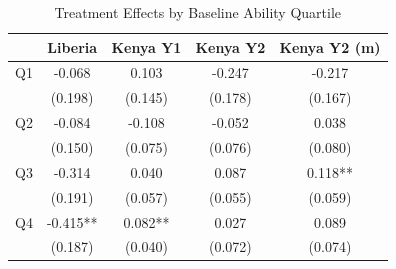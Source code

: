 \begin{table}[htbp]
\centering
\small
\caption{Treatment Effects by Baseline Ability Quartile}
\label{tab:quartiles}
\begin{tabular}{l*{4}{c}}
\toprule
 & Liberia & Kenya Y1 & Kenya Y2 & Kenya Y2 (m) \\
\midrule
Q1 & -0.068 & 0.103 & -0.247 & -0.217 \\
 & (0.198) & (0.145) & (0.178) & (0.167) \\
\addlinespace
Q2 & -0.084 & -0.108 & -0.052 & 0.038 \\
 & (0.150) & (0.075) & (0.076) & (0.080) \\
\addlinespace
Q3 & -0.314 & 0.040 & 0.087 & 0.118** \\
 & (0.191) & (0.057) & (0.055) & (0.059) \\
\addlinespace
Q4 & -0.415** & 0.082** & 0.027 & 0.089 \\
 & (0.187) & (0.040) & (0.072) & (0.074) \\
\bottomrule
\end{tabular}
\par\smallskip{}
\end{table}